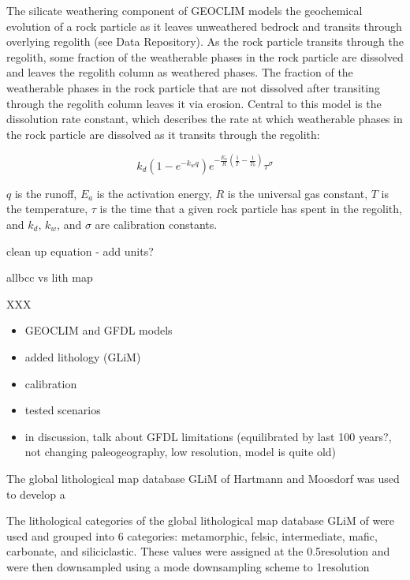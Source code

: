 \documentclass[11pt,letterpaper]{article}
\begin{document}
The silicate weathering component of GEOCLIM models the geochemical evolution of a rock particle as it leaves unweathered bedrock and transits through overlying regolith (see Data Repository). As the rock particle transits through the regolith, some fraction of the weatherable phases in the rock particle are dissolved and leaves the regolith column as weathered phases. The fraction of the weatherable phases in the rock particle that are not dissolved after transiting through the regolith column leaves it via erosion. Central to this model is the dissolution rate constant, which describes the rate at which weatherable phases in the rock particle are dissolved as it transits through the regolith:

\begin{equation}
    k_{d}\left(1-e^{-k_{w}q}\right)e^{-\frac{E_{a}}{R}\left(\frac{1}{T}-\frac{1}{T_{0}}\right)}\tau^{\sigma}
    \label{eq:1}
\end{equation}

$q$ is the runoff, $E_{a}$ is the activation energy, $R$ is the universal gas constant, $T$ is the temperature, $\tau$ is the time that a given rock particle has spent in the regolith, and $k_{d}$, $k_{w}$, and $\sigma$ are calibration constants.



clean up equation - add units?

allbcc vs lith map

XXX


\begin{itemize}
    \item GEOCLIM and GFDL models
    \item added lithology (GLiM)
    \item calibration
    \item tested scenarios
    \item in discussion, talk about GFDL limitations (equilibrated by last 100 years?, not changing paleogeography, low resolution, model is quite old)
\end{itemize}

The global lithological map database GLiM of Hartmann and Moosdorf was used to develop a

The lithological categories of the global lithological map database GLiM of \cite{Hartmann2012a} were used and grouped into 6 categories: metamorphic, felsic, intermediate, mafic, carbonate, and siliciclastic. These values were assigned at the 0.5\textdegree resolution and were then downsampled using a mode downsampling scheme to 1\textdegree resolution
\end{document}
